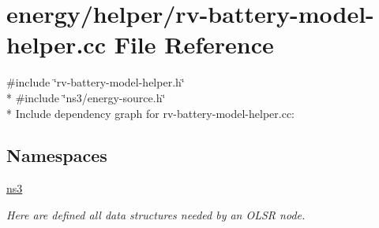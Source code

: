 \hypertarget{rv-battery-model-helper_8cc}{}\section{energy/helper/rv-\/battery-\/model-\/helper.cc File Reference}
\label{rv-battery-model-helper_8cc}
{\ttfamily \#include \char`\"{}rv-\/battery-\/model-\/helper.\+h\char`\"{}}\\*
{\ttfamily \#include \char`\"{}ns3/energy-\/source.\+h\char`\"{}}\\*
Include dependency graph for rv-\/battery-\/model-\/helper.cc\+:
\subsection*{Namespaces}
\begin{DoxyCompactItemize}
\item 
 \hyperlink{namespacens3}{ns3}
\begin{DoxyCompactList}\small\item\em Here are defined all data structures needed by an O\+L\+SR node. \end{DoxyCompactList}\end{DoxyCompactItemize}
